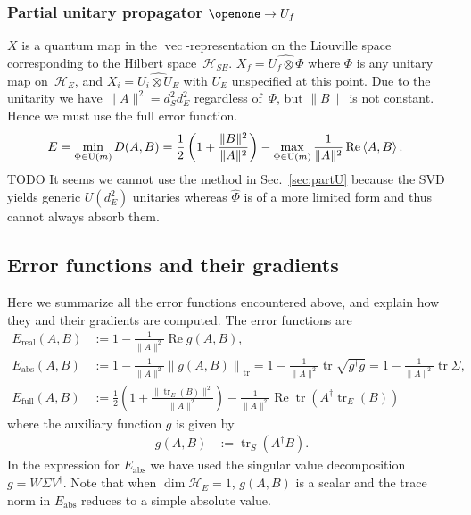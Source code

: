 \documentclass[aps, pra, a4paper, longbibliography, superscriptaddress]{revtex4-1}
\newcommand{\I}{\openone}
\newcommand{\inprod}[2]{\left\langle #1, #2 \right\rangle}
\newcommand{\hilb}[1]{\mathcal{#1}}
\DeclareMathOperator{\tr}{tr}
\DeclareMathOperator{\re}{Re}
\DeclareMathOperator{\cvec}{vec}
\newcommand{\vecop}[1]{\widehat{#1}}
\begin{document}
\subsubsection{Partial unitary propagator $\I \to U_f$}

$X$ is a quantum map in the $\cvec$-representation on the Liouville
space corresponding to the Hilbert space~$\hilb{H}_{SE}$.
$X_f = \vecop{U_f \otimes \Phi}$
where $\Phi$ is any unitary map on~$\hilb{H}_E$, and
$X_i = \vecop{U_i \otimes U_E}$ with $U_E$ unspecified at this point.
Due to the unitarity we have $\|A\|^2 = d_S^2 d_E^2$ regardless of~$\Phi$,
but $\|B\|$~is not constant. Hence we must use the full error function.
\begin{align}
\notag
E
&= \min_{\Phi \in \text{U}(m)} D(A, B)
= \frac{1}{2}\left(1 +\frac{\|B\|^2}{\|A\|^2}\right)
-\max_{\Phi \in \text{U}(m)} \frac{1}{\|A\|^2} \re \inprod{A}{B}.
\end{align}
TODO It seems we cannot use the method in Sec.~\ref{sec:partU}
because the SVD yields generic $U(d_E^2)$ unitaries whereas $\vecop{\Phi}$
is of a more limited form and thus cannot always absorb them.

\subsection{Error functions and their gradients}

Here we summarize all the error functions encountered above, and explain how they and their gradients are computed.
The error functions are
\begin{align}
E_\text{real}(A, B) &:= 1 -\frac{1}{\|A\|^2} \re g(A, B),\\
E_\text{abs}(A, B) &:= 1 -\frac{1}{\|A\|^2} \left\|g(A, B)\right\|_{\tr}
= 1 -\frac{1}{\|A\|^2} \tr \sqrt{g^\dagger g}
= 1 -\frac{1}{\|A\|^2} \tr \Sigma,\\
E_\text{full}(A, B) &:= \frac{1}{2}\left(1 +\frac{\|\tr_E(B)\|^2}{\|A\|^2}\right) -\frac{1}{\|A\|^2} \re \tr(A^\dagger \tr_E(B))
\end{align}
where the auxiliary function $g$ is given by
\begin{align}
g(A, B) &:= \tr_S(A^\dagger B).
\end{align}
In the expression for $E_\text{abs}$ we have used the singular value decomposition $g = W \Sigma V^\dagger$.
Note that when $\dim \hilb{H}_E = 1$, $g(A,B)$ is a scalar and the trace norm in $E_\text{abs}$
reduces to a simple absolute value.
\end{document}
